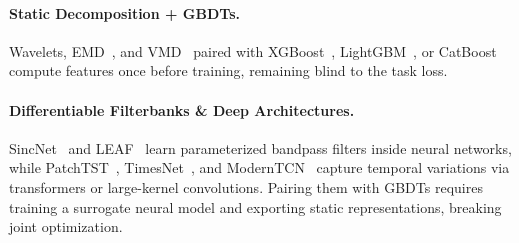 \documentclass[10pt]{article}
\begin{document}
\begin{table}[t]
\centering
\caption{Methodological positioning of AdaSigBoost against existing time-series and GBDT paradigms.}
\label{tab:gap_matrix}
\end{table}

\paragraph{Static Decomposition + GBDTs.} Wavelets, EMD~\citep{huang1998emd}, and VMD~\citep{dragomiretskiy2014vmd} paired with XGBoost~\citep{chen2016xgboost}, LightGBM~\citep{ke2017lightgbm}, or CatBoost~\citep{prokhorenkova2018catboost} compute features once before training, remaining blind to the task loss.
\paragraph{Differentiable Filterbanks \& Deep Architectures.} SincNet~\citep{ravanelli2018sincnet} and LEAF~\citep{zeghidour2021leaf} learn parameterized bandpass filters inside neural networks, while PatchTST~\citep{nie2023patchtst}, TimesNet~\citep{wu2023timesnet}, and ModernTCN~\citep{luo2024moderntcn} capture temporal variations via transformers or large-kernel convolutions. Pairing them with GBDTs requires training a surrogate neural model and exporting static representations, breaking joint optimization.
\end{document}
